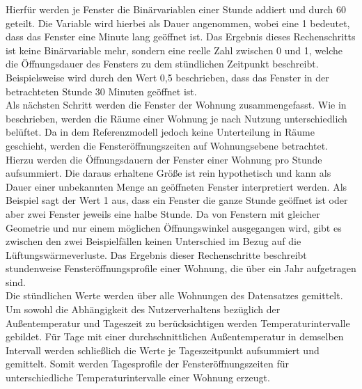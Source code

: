 Hierfür werden je Fenster die Binärvariablen einer Stunde addiert und durch 60 geteilt.
Die Variable wird hierbei als Dauer angenommen, wobei eine 1 bedeutet, dass das Fenster eine Minute lang geöffnet ist.
Das Ergebnis dieses Rechenschritts ist keine Binärvariable mehr, sondern eine reelle Zahl zwischen 0 und 1, welche die Öffnungsdauer des Fensters zu dem stündlichen Zeitpunkt beschreibt.
Beispielsweise wird durch den Wert 0,5 beschrieben, dass das Fenster in der betrachteten Stunde 30 Minuten geöffnet ist.\\
Als nächsten Schritt werden die Fenster der Wohnung zusammengefasst.
Wie in \cite{Osterhage.2018} beschrieben, werden die Räume einer Wohnung je nach Nutzung unterschiedlich belüftet.
Da in dem Referenzmodell jedoch keine Unterteilung in Räume geschieht, werden die Fensteröffnungszeiten auf Wohnungsebene betrachtet.
Hierzu werden die Öffnungsdauern der Fenster einer Wohnung pro Stunde aufsummiert.
Die daraus erhaltene Größe ist rein hypothetisch und kann als Dauer einer unbekannten Menge an geöffneten Fenster interpretiert werden.
Als Beispiel sagt der Wert 1 aus, dass ein Fenster die ganze Stunde geöffnet ist oder aber zwei Fenster jeweils eine halbe Stunde.
Da von Fenstern mit gleicher Geometrie und nur einem möglichen Öffnungswinkel ausgegangen wird, gibt es zwischen den zwei Beispielfällen keinen Unterschied im Bezug auf die Lüftungswärmeverluste.
Das Ergebnis dieser Rechenschritte beschreibt stundenweise Fensteröffnungsprofile einer Wohnung, die über ein Jahr aufgetragen sind.\\
Die stündlichen Werte werden über alle Wohnungen des Datensatzes gemittelt.
Um sowohl die Abhängigkeit des Nutzerverhaltens bezüglich der Außentemperatur und Tageszeit zu berücksichtigen werden Temperaturintervalle gebildet.
Für Tage mit einer durchschnittlichen Außentemperatur in demselben Intervall werden schließlich die Werte je Tageszeitpunkt aufsummiert und gemittelt.
Somit werden Tagesprofile der Fensteröffnungszeiten für unterschiedliche Temperaturintervalle einer Wohnung erzeugt.







